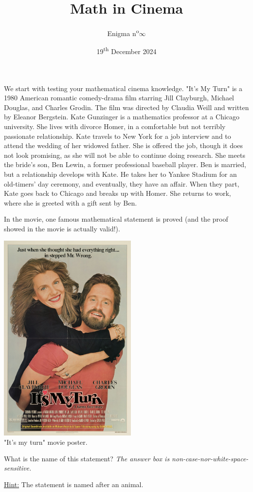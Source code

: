 \documentclass[a4paper, top=10mm]{article}
\title{\textbf{\huge{Math in Cinema}}}
\author{Enigma n\textsuperscript{o}$\infty$}
\date{19\textsuperscript{th} December 2024}
\begin{document}
	\maketitle
	
	We start with testing your mathematical cinema knowledge.
	"It's My Turn" is a 1980 American romantic comedy-drama film starring Jill Clayburgh, Michael Douglas, and Charles Grodin.
	The film was directed by Claudia Weill and written by Eleanor Bergstein.
	Kate Gunzinger is a mathematics professor at a Chicago university.
	She lives with divorce Homer, in a comfortable but not terribly passionate relationship.
	Kate travels to New York for a job interview and to attend the wedding of her widowed father.
	She is offered the job, though it does not look promising, as she will not be able to continue doing research.
	She meets the bride’s son, Ben Lewin, a former	professional baseball player.
	Ben is married, but a relationship develops with Kate.
	He takes her to Yankee Stadium for an old-timers’ day ceremony, and eventually, they have an affair.
	When they part, Kate goes back to Chicago and breaks up with Homer. She returns to work, where she is greeted with a gift sent by Ben.
	
	In the movie, one famous mathematical statement is proved (and the proof showed in the movie is actually valid!).
	
	\begin{center}
		\includegraphics[height=300pt]{10it_is_my_turn.png}\\
		"It's my turn" movie poster.
	\end{center}
	
	What is the name of this statement?
	\textit{The answer box is non-case-nor-white-space-sensitive.}
	
	\vspace{1cm}
	
	\underline{Hint:} The statement is named after an animal.
	
	
\end{document}
